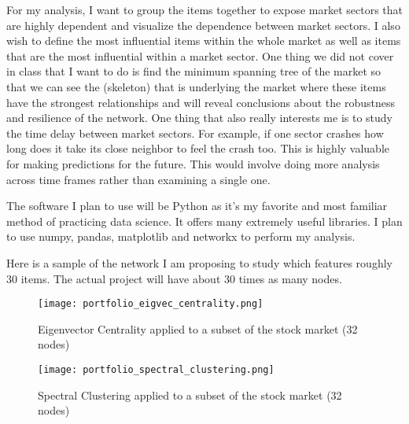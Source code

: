 \documentclass[a4paper,12pt]{article}%
\begin{document}
For my analysis, I want to group the items together to expose market sectors that are highly dependent and visualize the dependence between market sectors. I also wish to define the most influential items within the whole market as well as items that are the most influential within a market sector. One thing we did not cover in class that I want to do is find the minimum spanning tree of the market so that we can see the (skeleton) that is underlying the market where these items have the strongest relationships and will reveal conclusions about the robustness and resilience of the network. One thing that also really interests me is to study the time delay between market sectors. For example, if one sector crashes how long does it take its close neighbor to feel the crash too. This is highly valuable for making predictions for the future. This would involve doing more analysis across time frames rather than examining a single one. 

The software I plan to use will be Python as it's my favorite and most familiar method of practicing data science. It offers many extremely useful libraries. I plan to use numpy, pandas, matplotlib and networkx to perform my analysis. 

Here is a sample of the network I am proposing to study which features roughly 30 items. The actual project will have about 30 times as many nodes. 

\begin{figure}[htbp]
  \texttt{[image: portfolio\_eigvec\_centrality.png]}
  \caption{Eigenvector Centrality applied to a subset of the stock market (32 nodes)}
\end{figure}
\begin{figure}[htbp]
  \texttt{[image: portfolio\_spectral\_clustering.png]}
  \caption{Spectral Clustering applied to a subset of the stock market (32 nodes)}
\end{figure}
\end{document}

